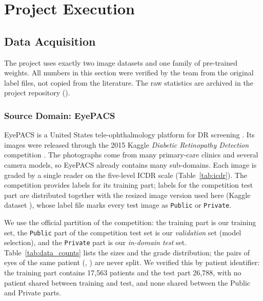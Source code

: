 \chapter{Project Execution}
\label{chap:project_execution}

\section{Data Acquisition}
\label{sec:data_acquisition}

The project uses exactly two image datasets and one family of pre-trained weights. All numbers in this section were verified by the team from the original label files, not copied from the literature. The raw statistics are archived in the project repository ().

\subsection{Source Domain: EyePACS}
\label{subsec:eyepacs}

EyePACS is a United States tele-ophthalmology platform for DR screening \cite{eyepacs2009}. Its images were released through the 2015 Kaggle \emph{Diabetic Retinopathy Detection} competition \cite{kagglecomp2015}. The photographs come from many primary-care clinics and several camera models, so EyePACS already contains many sub-domains. Each image is graded by a single reader on the five-level ICDR scale (Table~\ref{tab:icdr}). The competition provides labels for its training part; labels for the competition test part are distributed together with the resized image version used here (Kaggle dataset ), whose label file marks every test image as \texttt{Public} or \texttt{Private}.

We use the official partition of the competition: the training part is our training set, the \texttt{Public} part of the competition test set is our \emph{validation} set (model selection), and the \texttt{Private} part is our \emph{in-domain test} set. Table~\ref{tab:data_counts} lists the sizes and the grade distribution; the pairs of eyes of the same patient (, ) are never split. We verified this by patient identifier: the training part contains 17{,}563 patients and the test part 26{,}788, with no patient shared between training and test, and none shared between the Public and Private parts.

